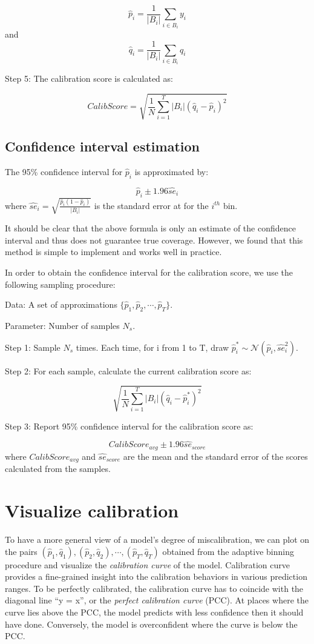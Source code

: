 $$\hat{p}_i = \frac{1}{|B_i|}\sum_{i \in B_i}y_i$$ and
$$\hat{q}_i = \frac{1}{|B_i|}\sum_{i \in B_i}q_i$$

Step 5: The calibration score is calculated as:

$$CalibScore = \sqrt{\frac{1}{N}\sum_{i=1}^T|B_i|(\hat{q}_i - \hat{p}_i)^2}$$

\subsection{Confidence interval estimation}

The 95\% confidence interval for $\hat{p}_i$ is approximated by:

$$\hat{p}_i \pm 1.96 \hat{se}_i$$ where $\hat{se}_i = \sqrt{\frac{\hat{p}_i\left(1 - \hat{p}_i\right)}{|B_i|}}$ is the standard error at for the $i^{th}$ bin.

It should be clear that the above formula is only an estimate of the confidence interval and thus does not guarantee true coverage. However, we found that this method is simple to implement and works well in practice.

In order to obtain the confidence interval for the calibration score, we use the following sampling procedure:

Data: A set of approximations $\{\hat{p}_1, \hat{p}_2, \cdots, \hat{p}_T\}$.

Parameter: Number of samples $N_{s}$.

Step 1: Sample $N_{s}$ times. Each time, for i from 1 to T, draw $\hat{p}^*_i \sim \mathcal{N}\left(\hat{p}_i, \hat{se}^2_i\right)$.  

Step 2: For each sample, calculate the current calibration score as:

$$\sqrt{\frac{1}{N}\sum_{i=1}^T|B_i|(\hat{q}_i - \hat{p}_i^*)^2}$$

Step 3: Report 95\% confidence interval for the calibration score as:

$$CalibScore_{avg} \pm 1.96\hat{se}_{score}$$ where $CalibScore_{avg}$ and $\hat{se}_{score}$ are the mean and the standard error of the scores calculated from the samples. 

\section{Visualize calibration}

To have a more general view of a model's degree of miscalibration, we can plot on the pairs $(\hat{p}_1, \hat{q}_1), (\hat{p}_2, \hat{q}_2), \cdots, (\hat{p}_T, \hat{q}_T)$ obtained from the adaptive binning procedure and visualize the \textit{calibration curve} of the model. Calibration curve provides a fine-grained insight into the calibration behaviors in various prediction ranges. To be perfectly calibrated, the calibration curve has to coincide with the diagonal line ``y = x'', or the \textit{perfect calibration curve} (PCC). At places where the curve lies above the PCC, the model predicts with less confidence then it should have done. Conversely, the model is overconfident where the curve is below the PCC.

